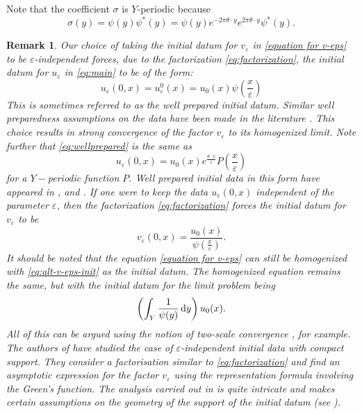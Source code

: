 \documentclass[preprint, 12pt]{amsart}
\numberwithin{equation}{section}
\newtheorem{remark}[theorem]{Remark}        %
\numberwithin{equation}{section}
\newcommand{\eps}{\varepsilon}
\begin{document}
Note that the coefficient $\sigma$ is $Y$-periodic because
\begin{equation*}
\sigma(y) 
= \psi(y)\psi^\ast(y)
= \psi(y)e^{-2\pi \theta \cdot y} e^{2\pi \theta \cdot y}\psi^\ast(y).
\end{equation*}
\begin{remark}\label{rem:wellprepared}
Our choice of taking the initial datum for $v_\eps$ in \eqref{equation for v-eps} to be $\eps$-independent forces, due to the factorization \eqref{eq:factorization}, the initial datum for $u_\eps$ in \eqref{eq:main} to be of the form:
\begin{equation}\label{eq:wellprepared}
u_\eps(0,x) = u^0_\eps(x) = u_0(x) \psi\left(\frac{x}{\eps}\right)
\end{equation}
This is sometimes referred to as the well prepared initial datum. Similar well preparedness assumptions on the data have been made in the literature \cite{allaire2004homogenization, allaire2007homogenization}. This choice results in strong convergence of the factor $v_\eps$ to its homogenized limit. Note further that \eqref{eq:wellprepared} is the same as 
\[
u_\eps(0,x) = u_0(x) e^{\frac{\theta\cdot x}{\eps}} P\left(\frac{x}{\eps}\right)
\]
for a $Y-$periodic function $P$. Well prepared initial data in this form have appeared in \cite[Remark 3.2]{allaire2007homogenization}, \cite[Theorem 4.4]{MR1796243} and \cite[Theorem 3.2]{allaire2004homogenization}. If one were to keep the data $u_\eps(0,x)$ independent of the parameter $\eps$, then the factorization \eqref{eq:factorization} forces the initial datum for $v_\eps$ to be
\begin{equation}\label{eq:alt-v-eps-init}
v_\eps(0,x) = \frac{u_0(x)}{\psi\left(\frac{x}{\eps}\right)}.
\end{equation}
It should be noted that the equation \eqref{equation for v-eps} can still be homogenized with \eqref{eq:alt-v-eps-init} as the initial datum. The homogenized equation remains the same, but with the initial datum for the limit problem being
\begin{equation*}
\left(\int_Y\frac{1}{\psi(y)}\, {\rm d}y \right) u_0(x).
\end{equation*}
All of this can be argued using the notion of two-scale convergence \cite{allaire1992homogenization}, for example. The authors of \cite{allaire2012homogenization} have studied the case of $\eps$-independent initial data with compact support. They consider a factorisation similar to \eqref{eq:factorization} and find an asymptotic expression for the factor $v_{\eps}$ using the representation formula involving the Green's function. The analysis carried out in \cite{allaire2012homogenization} is quite intricate and makes certain assumptions on the geometry of the support of the initial datum (see \cite[page 305]{allaire2012homogenization}).
\end{remark}
\end{document}
